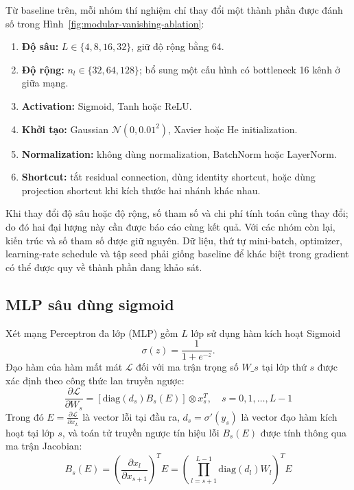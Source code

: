 \documentclass[12pt]{article}
\begin{document}
Từ baseline trên, mỗi nhóm thí nghiệm chỉ thay đổi một thành phần được đánh số
trong Hình~\ref{fig:modular-vanishing-ablation}:
\begin{enumerate}[label=\textbf{\arabic*.}, leftmargin=2.2em, itemsep=3pt]
    \item \textbf{Độ sâu:} $L\in\{4,8,16,32\}$, giữ độ rộng bằng 64.
    \item \textbf{Độ rộng:} $n_l\in\{32,64,128\}$; bổ sung một cấu hình có
    bottleneck 16 kênh ở giữa mạng.
    \item \textbf{Activation:} Sigmoid, Tanh hoặc ReLU.
    \item \textbf{Khởi tạo:} Gaussian
    $\mathcal{N}(0,0.01^2)$, Xavier hoặc He initialization.
    \item \textbf{Normalization:} không dùng normalization, BatchNorm hoặc
    LayerNorm.
    \item \textbf{Shortcut:} tắt residual connection, dùng identity shortcut,
    hoặc dùng projection shortcut khi kích thước hai nhánh khác nhau.
\end{enumerate}

Khi thay đổi độ sâu hoặc độ rộng, số tham số và chi phí tính toán cũng thay đổi;
do đó hai đại lượng này cần được báo cáo cùng kết quả. Với các nhóm còn lại,
kiến trúc và số tham số được giữ nguyên. Dữ liệu, thứ tự mini-batch, optimizer,
learning-rate schedule và tập seed phải giống baseline để khác biệt trong
gradient có thể được quy về thành phần đang khảo sát.

\subsection{MLP sâu dùng sigmoid}
Xét mạng Perceptron đa lớp (MLP) gồm $L$ lớp sử dụng hàm kích hoạt Sigmoid
\begin{equation}
    \sigma(z)=\frac{1}{1+e^{-z}}.
\end{equation}
Đạo hàm của hàm mất mát $\mathcal{L}$ đối với ma trận trọng số $W\_s$ tại lớp thứ $s$ được xác định theo công thức lan truyền ngược:
\begin{equation}
    \frac{\partial \mathcal{L}}{\partial W_s} = \left[ \text{diag}(d_s) B_s(E) \right] \otimes x_s^T, \quad s= 0, 1, \dots, L-1
\end{equation}
Trong đó $E = \frac{\partial \mathcal{L}}{\partial x_L}$ là vector lỗi tại đầu ra, $d_s= \sigma'(y_s)$ là vector đạo hàm kích hoạt tại lớp $s$, và toán tử truyền ngược tín hiệu lỗi $B_s(E)$ được tính thông qua ma trận Jacobian:
\begin{equation}
    B_s(E)= \left( \frac{\partial x_l}{\partial x_{s+1}} \right)^T E = \left(\prod_{l = s+1}^{L-1} \text{diag}(d_l) W_l \right)^T E
\end{equation}
\end{document}
